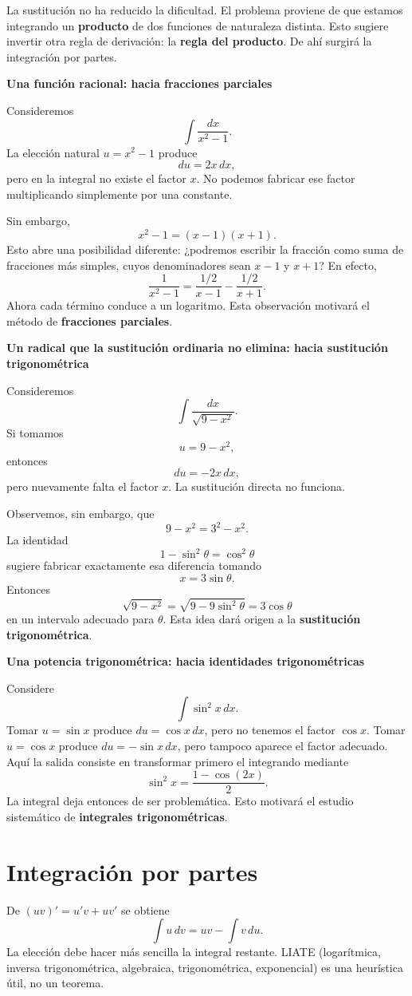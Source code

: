 \documentclass[12pt]{article}
\theoremstyle{definition}
\theoremstyle{remark}
\begin{document}
La sustitución no ha reducido la dificultad. El problema proviene de que estamos integrando un \textbf{producto} de dos funciones de naturaleza distinta. Esto sugiere invertir otra regla de derivación: la \textbf{regla del producto}. De ahí surgirá la integración por partes.

\textbf{Una función racional: hacia fracciones parciales}

Consideremos
\[
\int\frac{dx}{x^2-1}.
\]
La elección natural $u=x^2-1$ produce
\[
du=2x\,dx,
\]
pero en la integral no existe el factor $x$. No podemos fabricar ese factor multiplicando simplemente por una constante.

Sin embargo,
\[
x^2-1=(x-1)(x+1).
\]
Esto abre una posibilidad diferente: ¿podremos escribir la fracción como suma de fracciones más simples, cuyos denominadores sean $x-1$ y $x+1$? En efecto,
\[
\frac1{x^2-1}
=\frac{1/2}{x-1}-\frac{1/2}{x+1}.
\]
Ahora cada término conduce a un logaritmo. Esta observación motivará el método de \textbf{fracciones parciales}.

\textbf{Un radical que la sustitución ordinaria no elimina: hacia sustitución trigonométrica}

Consideremos
\[
\int\frac{dx}{\sqrt{9-x^2}}.
\]
Si tomamos
\[
u=9-x^2,
\]
entonces
\[
du=-2x\,dx,
\]
pero nuevamente falta el factor $x$. La sustitución directa no funciona.

Observemos, sin embargo, que
\[
9-x^2=3^2-x^2.
\]
La identidad
\[
1-\sin^2\theta=\cos^2\theta
\]
sugiere fabricar exactamente esa diferencia tomando
\[
x=3\sin\theta.
\]
Entonces
\[
\sqrt{9-x^2}
=\sqrt{9-9\sin^2\theta}
=3\cos\theta
\]
en un intervalo adecuado para $\theta$. Esta idea dará origen a la \textbf{sustitución trigonométrica}.

\textbf{Una potencia trigonométrica: hacia identidades trigonométricas}

Considere
\[
\int\sin^2x\,dx.
\]
Tomar $u=\sin x$ produce $du=\cos x\,dx$, pero no tenemos el factor $\cos x$. Tomar $u=\cos x$ produce $du=-\sin x\,dx$, pero tampoco aparece el factor adecuado. Aquí la salida consiste en transformar primero el integrando mediante
\[
\sin^2x=\frac{1-\cos(2x)}2.
\]
La integral deja entonces de ser problemática. Esto motivará el estudio sistemático de \textbf{integrales trigonométricas}.


\section{Integración por partes}
De $(uv)'=u'v+uv'$ se obtiene
\[\boxed{\int u\,dv=uv-\int v\,du}.\]
La elección debe hacer más sencilla la integral restante. LIATE (logarítmica, inversa trigonométrica, algebraica, trigonométrica, exponencial) es una heurística útil, no un teorema.
\end{document}
